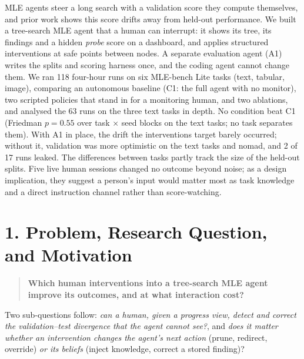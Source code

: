 \documentclass[11pt]{article}
\begin{document}
MLE agents steer a long search with a validation score they compute themselves, and
prior work shows this score drifts away from held-out performance. We built a
tree-search MLE agent that a human can interrupt: it shows its tree, its findings and a
hidden \emph{probe} score on a dashboard, and applies structured interventions at safe
points between nodes. A separate evaluation agent (A1) writes the splits and scoring
harness once, and the coding agent cannot change them. We ran 118 four-hour runs on six
MLE-bench Lite tasks (text, tabular, image), comparing an autonomous baseline (C1: the
full agent with no monitor), two scripted policies that stand in for a monitoring human,
and two ablations, and analysed the 63 runs on the three text tasks in depth. No
condition beat C1 (Friedman $p = 0.55$ over task $\times$ seed blocks on the text tasks;
no task separates them). With A1 in place, the drift the interventions target barely
occurred; without it, validation was more optimistic on the text tasks and nomad, and 2
of 17 runs leaked. The differences between tasks partly track the size of the
held-out splits. Five live human sessions changed no outcome beyond noise; as a design
implication, they suggest a person's input would matter most as task knowledge and a
direct instruction channel rather than score-watching.

\section*{1. Problem, Research Question, and Motivation}

\begin{quote}
\textbf{Which human interventions into a tree-search MLE agent improve its outcomes,
and at what interaction cost?}
\end{quote}
\vspace{-0.3em}
Two sub-questions follow: \emph{can a human, given a progress view, detect and correct
the validation--test divergence that the agent cannot see?}, and \emph{does it matter
whether an intervention changes the agent's next action} (prune, redirect, override)
\emph{or its beliefs} (inject knowledge, correct a stored finding)?
\end{document}
